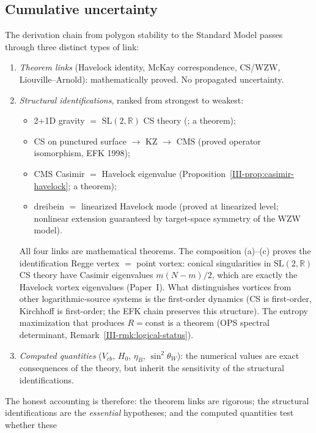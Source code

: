 \subsection{Cumulative uncertainty}
\label{sec:uncertainty}
The derivation chain from polygon stability to the Standard
Model passes through three distinct types of link:
\begin{enumerate}
\item \emph{Theorem links} (Havelock identity, McKay
  correspondence, CS/WZW, Liouville--Arnold):
  mathematically proved.  No propagated uncertainty.
\item \emph{Structural identifications}, ranked from
  strongest to weakest:
  \begin{itemize}
  \item[\textbf{(a)}] 2+1D gravity $=$ $\mathrm{SL}(2,\mathbb{R})$
    CS theory (\citealt{Witten1988}; a theorem);
  \item[\textbf{(b)}] CS on punctured surface $\to$ KZ $\to$ CMS
    (proved operator isomorphism, EFK 1998);
  \item[\textbf{(c)}] CMS Casimir $=$ Havelock eigenvalue
    (Proposition~\ref{III-prop:casimir-havelock}; a theorem);
  \item[\textbf{(d)}] dreibein $=$ linearized Havelock mode
    (proved at linearized level; nonlinear extension
    guaranteed by target-space symmetry of the WZW model).
  \end{itemize}
  All four links are mathematical theorems.
  The composition (a)--(c) proves the identification
  Regge vertex $=$ point vortex: conical singularities
  in $\mathrm{SL}(2,\mathbb{R})$ CS theory have
  Casimir eigenvalues $m(N{-}m)/2$, which are exactly
  the Havelock vortex eigenvalues (Paper~I).
  What distinguishes vortices from other logarithmic-source
  systems is the first-order dynamics (CS is first-order,
  Kirchhoff is first-order; the EFK chain preserves this
  structure).
  The entropy maximization that produces $R = \mathrm{const}$
  is a theorem (OPS spectral determinant,
  Remark~\ref{III-rmk:logical-status}).
\item \emph{Computed quantities} ($V_{cb}$, $H_0$, $\eta_B$,
  $\sin^2\theta_W$): the numerical values are exact consequences
  of the theory, but inherit the sensitivity of the structural
  identifications.
\end{enumerate}
The honest accounting is therefore: the theorem links are
rigorous; the structural identifications are the \emph{essential}
hypotheses; and the computed quantities test whether these
